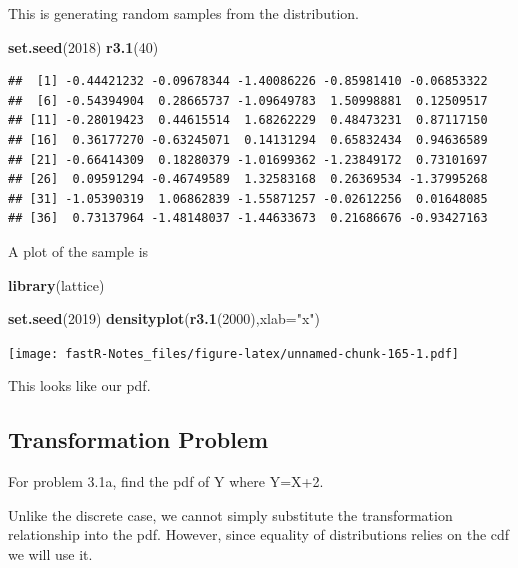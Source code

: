 \documentclass[]{book}
\newenvironment{Shaded}{\begin{snugshade}}{\end{snugshade}}
\newcommand{\KeywordTok}[1]{\textcolor[rgb]{0.13,0.29,0.53}{\textbf{#1}}}
\newcommand{\DataTypeTok}[1]{\textcolor[rgb]{0.13,0.29,0.53}{#1}}
\newcommand{\DecValTok}[1]{\textcolor[rgb]{0.00,0.00,0.81}{#1}}
\newcommand{\StringTok}[1]{\textcolor[rgb]{0.31,0.60,0.02}{#1}}
\newcommand{\NormalTok}[1]{#1}
\theoremstyle{definition}
\theoremstyle{definition}
\theoremstyle{definition}
\theoremstyle{remark}
\begin{document}
This is generating random samples from the distribution.

\begin{Shaded}
\begin{Highlighting}[]
\KeywordTok{set.seed}\NormalTok{(}\DecValTok{2018}\NormalTok{)}
\KeywordTok{r3.1}\NormalTok{(}\DecValTok{40}\NormalTok{)}
\end{Highlighting}
\end{Shaded}

\begin{verbatim}
##  [1] -0.44421232 -0.09678344 -1.40086226 -0.85981410 -0.06853322
##  [6] -0.54394904  0.28665737 -1.09649783  1.50998881  0.12509517
## [11] -0.28019423  0.44615514  1.68262229  0.48473231  0.87117150
## [16]  0.36177270 -0.63245071  0.14131294  0.65832434  0.94636589
## [21] -0.66414309  0.18280379 -1.01699362 -1.23849172  0.73101697
## [26]  0.09591294 -0.46749589  1.32583168  0.26369534 -1.37995268
## [31] -1.05390319  1.06862839 -1.55871257 -0.02612256  0.01648085
## [36]  0.73137964 -1.48148037 -1.44633673  0.21686676 -0.93427163
\end{verbatim}

A plot of the sample is

\begin{Shaded}
\begin{Highlighting}[]
\KeywordTok{library}\NormalTok{(lattice)}
\end{Highlighting}
\end{Shaded}

\begin{Shaded}
\begin{Highlighting}[]
\KeywordTok{set.seed}\NormalTok{(}\DecValTok{2019}\NormalTok{)}
\KeywordTok{densityplot}\NormalTok{(}\KeywordTok{r3.1}\NormalTok{(}\DecValTok{2000}\NormalTok{),}\DataTypeTok{xlab=}\StringTok{"x"}\NormalTok{)}
\end{Highlighting}
\end{Shaded}

\texttt{[image: fastR-Notes\_files/figure-latex/unnamed-chunk-165-1.pdf]}

This looks like our pdf.

\subsection{Transformation Problem}\label{transformation-problem}

For problem 3.1a, find the pdf of Y where Y=X+2.

Unlike the discrete case, we cannot simply substitute the transformation
relationship into the pdf. However, since equality of distributions
relies on the cdf we will use it.
\end{document}
